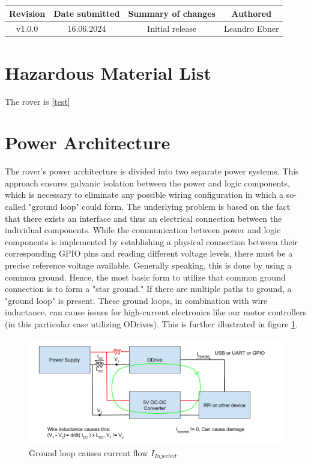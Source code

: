     \begin{table}[b]
        \centering
        \begin{tabular}{|c|c|c|c|} \hline 
             Revision&  Date submitted& Summary of changes  &Authored\\ \hline 
             v1.0.0&  16.06.2024& Initial release  &Leandro Ebner\\ \hline
        \end{tabular}
    \end{table}
    
    \clearpage

\section{Hazardous Material List}

    The rover is \ref{test}
    \clearpage
    
\section{Power Architecture}

    The rover's power architecture is divided into two separate power systems. This approach ensures galvanic isolation between the power and logic components, which is necessary to eliminate any possible wiring configuration in which a so-called "ground loop" could form. The underlying problem is based on the fact that there exists an interface and thus an electrical connection between the individual components. While the communication between power and logic components is implemented by establishing a physical connection between their corresponding GPIO pins and reading different voltage levels, there must be a precise reference voltage available. Generally speaking, this is done by using a common ground. Hence, the most basic form to utilize that common ground connection is to form a "star ground." If there are multiple paths to ground, a "ground loop" is present. These ground loops, in combination with wire inductance, can cause issues for high-current electronics like our motor controllers (in this particular case utilizing ODrives). This is further illustrated in figure \ref{ground_loop_bad}.
    
    \begin{figure}[h]
    \includegraphics[width=\textwidth]{contents/figures/ground_loop_bad.png}
    \caption{Ground loop causes current flow $I_{Injected}$.}
    \label{ground_loop_bad}
    \end{figure}
    

